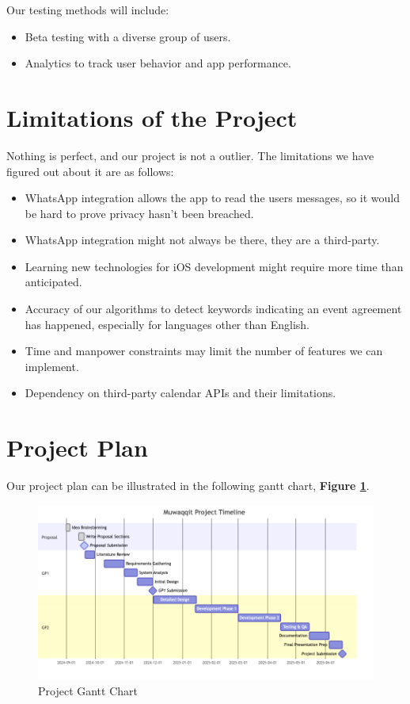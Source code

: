 \documentclass[12pt,a4paper]{article}
\begin{document}
Our testing methods will include:
\begin{itemize}
    \item Beta testing with a diverse group of users.
    \item Analytics to track user behavior and app performance.
\end{itemize}

\section{Limitations of the Project}

Nothing is perfect, and our project is not a outlier. The limitations we have figured out about it are as follows:

\begin{itemize}
    \item WhatsApp integration allows the app to read the users messages, so it would be hard to prove privacy hasn't been breached.
    \item WhatsApp integration might not always be there, they are a third-party.
    \item Learning new technologies for iOS development might require more time than anticipated.
    \item Accuracy of our algorithms to detect keywords indicating an event agreement has happened, especially for languages other than English.
    \item Time and manpower constraints may limit the number of features we can implement.
    \item Dependency on third-party calendar APIs and their limitations.
\end{itemize}

\section{Project Plan}

Our project plan can be illustrated in the following gantt chart, \textbf{Figure \ref{fig:project-gantt-chart}}.

\begin{figure}[!h]
    \centering
    \includegraphics[width=\textwidth]{images/gantt.png}
    \caption{Project Gantt Chart}
    \label{fig:project-gantt-chart}
\end{figure}
\end{document}
